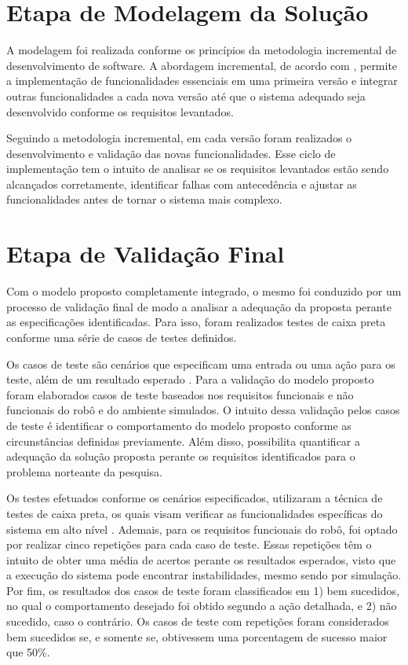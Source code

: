 \section{Etapa de Modelagem da Solução}
A modelagem foi realizada conforme os princípios da metodologia incremental de desenvolvimento de software. A abordagem incremental, de acordo com \citet{softwareSommerville:2011}, permite a implementação de funcionalidades essenciais em uma primeira versão e integrar outras funcionalidades a cada nova versão até que o sistema adequado seja desenvolvido conforme os requisitos levantados. 

Seguindo a metodologia incremental, em cada versão foram realizados o desenvolvimento e validação das novas funcionalidades. Esse ciclo de implementação tem o intuito de analisar se os requisitos levantados estão sendo alcançados corretamente, identificar falhas com antecedência e ajustar as funcionalidades antes de tornar o sistema mais complexo. 

\section{Etapa de Validação Final}
Com o modelo proposto completamente integrado, o mesmo foi conduzido por um processo de validação final de modo a analisar a adequação da proposta perante as especificações identificadas. Para isso, foram realizados testes de caixa preta conforme uma série de casos de testes definidos.

Os casos de teste são cenários que especificam uma entrada ou uma ação para os teste, além de um resultado esperado \cite{testes}. Para a validação do modelo proposto foram elaborados casos de teste baseados nos requisitos funcionais e não funcionais do robô e do ambiente simulados. O intuito dessa validação pelos casos de teste é identificar o comportamento do modelo proposto conforme as circunstâncias definidas previamente. Além disso, possibilita quantificar a adequação da solução proposta perante os requisitos identificados para o problema norteante da pesquisa. 

Os testes efetuados conforme os cenários especificados, utilizaram a técnica de testes de caixa preta, os quais visam verificar as funcionalidades específicas do sistema em alto nível \cite{testes}. Ademais, para os requisitos funcionais do robô, foi optado por realizar cinco repetições para cada caso de teste. Essas repetições têm o intuito de obter uma média de acertos perante os resultados esperados, visto que a execução do sistema pode encontrar instabilidades, mesmo sendo por simulação. Por fim, os resultados dos casos de teste foram classificados em 1) bem sucedidos, no qual o comportamento desejado foi obtido segundo a ação detalhada, e 2) não sucedido, caso o contrário. Os casos de teste com repetições foram considerados bem sucedidos se, e somente se, obtivessem uma porcentagem de sucesso maior que 50\%.


